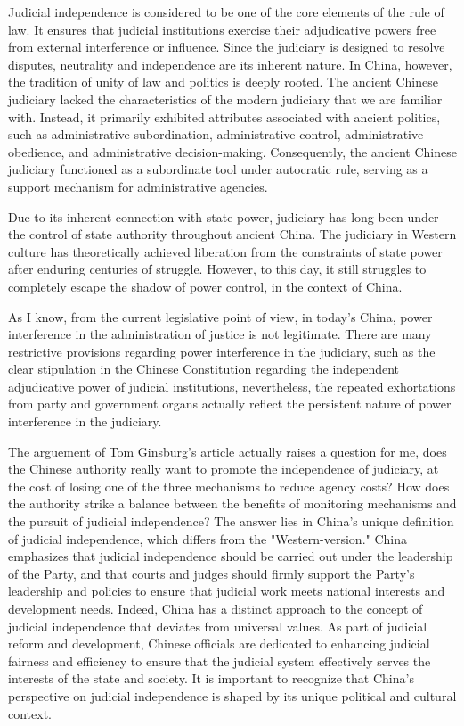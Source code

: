 \documentclass[]{article}
\begin{document}
Judicial independence is considered to be one of the core elements of the rule of law. It ensures that judicial institutions exercise their adjudicative powers free from external interference or influence. 
Since the judiciary is designed to resolve disputes, neutrality and independence are its inherent nature. In China, however, the tradition of unity of law and politics is deeply rooted. 
The ancient Chinese judiciary lacked the characteristics of the modern judiciary that we are familiar with. Instead, it primarily exhibited attributes associated with ancient politics, such as administrative subordination, administrative control, administrative obedience, and administrative decision-making. Consequently, the ancient Chinese judiciary functioned as a subordinate tool under autocratic rule, serving as a support mechanism for administrative agencies.

Due to its inherent connection with state power, judiciary has long been under the control of state authority throughout ancient China. The judiciary in Western culture has theoretically achieved liberation from the constraints of state power after enduring centuries of struggle. However, to this day, it still struggles to completely escape the shadow of power control, in the context of China. 

As I know, from the current legislative point of view, in today's China, power interference in the administration of justice is not legitimate. There are many restrictive provisions regarding power interference in the judiciary, such as the clear stipulation in the Chinese Constitution regarding the independent adjudicative power of judicial institutions, nevertheless, the repeated exhortations from party and government organs actually reflect the persistent nature of power interference in the judiciary.

The arguement of Tom Ginsburg’s article actually raises a question for me, does the Chinese authority really want to promote the independence of judiciary, at the cost of losing one of the three mechanisms to reduce agency costs? How does the authority strike a balance between the benefits of monitoring mechanisms and the pursuit of judicial independence? The answer lies in China's unique definition of judicial independence, which differs from the "Western-version." China emphasizes that judicial independence should be carried out under the leadership of the Party, and that courts and judges should firmly support the Party's leadership and policies to ensure that judicial work meets national interests and development needs. Indeed, China has a distinct approach to the concept of judicial independence that deviates from universal values.  As part of judicial reform and development, Chinese officials are dedicated to enhancing judicial fairness and efficiency to ensure that the judicial system effectively serves the interests of the state and society. It is important to recognize that China's perspective on judicial independence is shaped by its unique political and cultural context.


\pagebreak


\sloppy

\printbibliography
\end{document}
